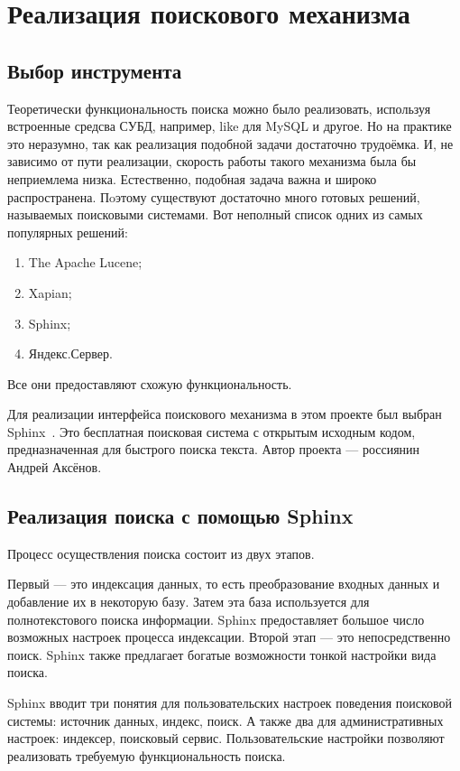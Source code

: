 \section{Реализация поискового механизма}


\subsection{Выбор инструмента}

Теоретически функциональность поиска можно было реализовать, используя
встроенные средсва СУБД, например, like для MySQL и другое.
Но на практике это неразумно, так как реализация подобной задачи 
достаточно трудоёмка.
И, не зависимо от пути реализации, скорость работы такого механизма была бы неприемлема низка.
Естественно, подобная задача важна и широко распространена.
Пoэтому существуют достаточно много готовых решений, называемых поисковыми системами.
Вот неполный список одних из самых популярных решений:
\begin{enumerate}
    \item The Apache Lucene;
    \item Xapian;
    \item Sphinx;
    \item Яндекс.Сервер.
\end{enumerate}

Все они предоставляют схожую функциональность.

Для реализации интерфейса поискового механизма в этом проекте был выбран Sphinx~\cite{sphinx}. 
Это бесплатная поисковая система с открытым исходным кодом, 
предназначенная для быстрого поиска текста. 
Автор проекта --- россиянин Андрей Аксёнов.

\subsection{Реализация поиска с помощью Sphinx}

Процесс осуществления поиска состоит из двух этапов.

Первый --- это индексация данных, то есть преобразование входных данных и добавление их в некоторую базу.
Затем эта база используется для полнотекстового поиска информации.
Sphinx предоставляет большое число возможных настроек процесса индексации.
Второй этап --- это непосредственно поиск. Sphinx также предлагает богатые возможности тонкой настройки вида поиска.

Sphinx вводит три понятия для пользовательских настроек поведения поисковой системы: источник данных, индекс, поиск.
А также два для административных настроек: индексер, поисковый сервис.
Пользовательские настройки позволяют реализовать требуемую функциональность поиска.

